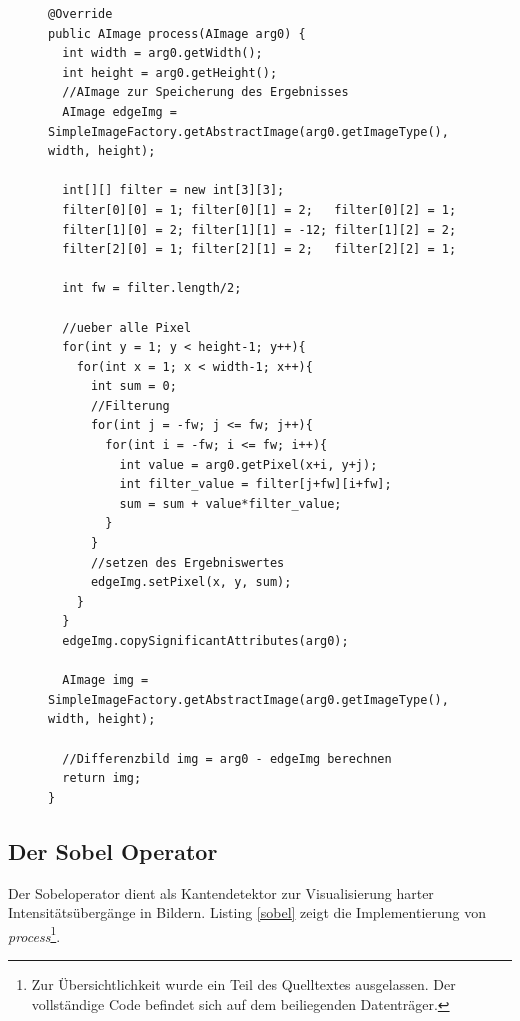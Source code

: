 \begin{figure}[htbp]
\begin{lstlisting}[frame=leftline]
@Override
public AImage process(AImage arg0) {
  int width = arg0.getWidth();
  int height = arg0.getHeight();
  //AImage zur Speicherung des Ergebnisses	
  AImage edgeImg = SimpleImageFactory.getAbstractImage(arg0.getImageType(), width, height);

  int[][] filter = new int[3][3];
  filter[0][0] = 1; filter[0][1] = 2;   filter[0][2] = 1; 
  filter[1][0] = 2; filter[1][1] = -12; filter[1][2] = 2;
  filter[2][0] = 1; filter[2][1] = 2;   filter[2][2] = 1;

  int fw = filter.length/2;
  
  //ueber alle Pixel		
  for(int y = 1; y < height-1; y++){
    for(int x = 1; x < width-1; x++){
      int sum = 0;
      //Filterung
      for(int j = -fw; j <= fw; j++){
        for(int i = -fw; i <= fw; i++){
          int value = arg0.getPixel(x+i, y+j);
          int filter_value = filter[j+fw][i+fw];
          sum = sum + value*filter_value;
        }
      }
      //setzen des Ergebniswertes
      edgeImg.setPixel(x, y, sum);
    }
  }
  edgeImg.copySignificantAttributes(arg0);
		
  AImage img = SimpleImageFactory.getAbstractImage(arg0.getImageType(), width, height);
		
  //Differenzbild img = arg0 - edgeImg berechnen
  return img;
}
\end{lstlisting}
\end{figure}
 
\FloatBarrier
\subsection{Der Sobel Operator}

Der Sobeloperator dient als Kantendetektor zur Visualisierung harter Intensitätsübergänge in Bildern. Listing \ref{sobel} zeigt die Implementierung von \textit{process}\footnote{Zur Übersichtlichkeit wurde ein Teil des Quelltextes ausgelassen. Der vollständige Code befindet sich auf dem beiliegenden Datenträger.}.

